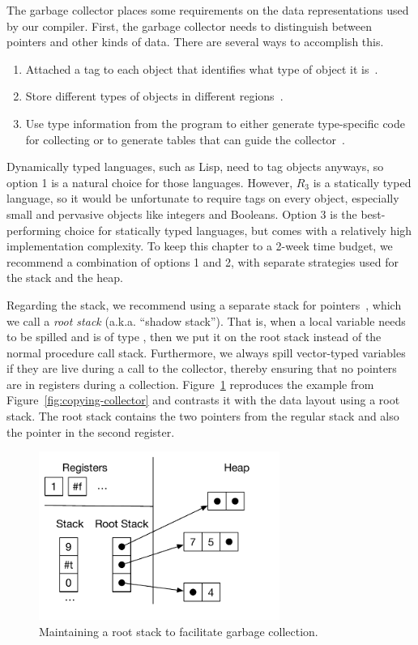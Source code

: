 \documentclass[11pt]{book}
\begin{document}
The garbage collector places some requirements on the data
representations used by our compiler. First, the garbage collector
needs to distinguish between pointers and other kinds of data. There
are several ways to accomplish this.
\begin{enumerate}
\item Attached a tag to each object that identifies what type of
  object it is~\citep{McCarthy:1960dz}.
\item Store different types of objects in different
  regions~\citep{Steele:1977ab}.
\item Use type information from the program to either generate
  type-specific code for collecting or to generate tables that can
  guide the
  collector~\citep{Appel:1989aa,Goldberg:1991aa,Diwan:1992aa}.
\end{enumerate}
Dynamically typed languages, such as Lisp, need to tag objects
anyways, so option 1 is a natural choice for those languages.
However, $R_3$ is a statically typed language, so it would be
unfortunate to require tags on every object, especially small and
pervasive objects like integers and Booleans.  Option 3 is the
best-performing choice for statically typed languages, but comes with
a relatively high implementation complexity. To keep this chapter to a
2-week time budget, we recommend a combination of options 1 and 2,
with separate strategies used for the stack and the heap.

Regarding the stack, we recommend using a separate stack for
pointers~\citep{Siebert:2001aa,Henderson:2002aa,Baker:2009aa}, which
we call a \emph{root stack} (a.k.a. ``shadow stack''). That is, when a
local variable needs to be spilled and is of type , then we put it on the root stack instead
of the normal procedure call stack. Furthermore, we always spill
vector-typed variables if they are live during a call to the
collector, thereby ensuring that no pointers are in registers during a
collection. Figure~\ref{fig:shadow-stack} reproduces the example from
Figure~\ref{fig:copying-collector} and contrasts it with the data
layout using a root stack. The root stack contains the two pointers
from the regular stack and also the pointer in the second
register.

\begin{figure}[tbp]
\centering \includegraphics[width=0.7\textwidth]{figs/root-stack}
\caption{Maintaining a root stack to facilitate garbage collection.}
\label{fig:shadow-stack}
\end{figure}
\end{document}
